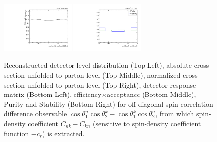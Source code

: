 \begin{figure}[htb]
\begin{center}
 \includegraphics[width=0.32\textwidth]{fig_fullRun2UL/unfolding/combined/TotEff_c_Mnk.pdf}
 \includegraphics[width=0.32\textwidth]{fig_fullRun2UL/unfolding/combined/PurStab_c_Mnk.pdf} \\
\caption{Reconstructed detector-level distribution (Top Left), absolute cross-section unfolded to parton-level (Top Middle), normalized cross-section unfolded to parton-level (Top Right), detector response-matrix (Bottom Left), efficiency$\times$acceptance (Bottom Middle), Purity and Stability (Bottom Right) for off-diagonal spin correlation difference observable $\cos\theta_{1}^{n}\cos\theta_{2}^{k}-\cos\theta_{1}^{k}\cos\theta_{2}^{n}$, from which spin-density coefficient $C_{nk}-C_{kn}$ (sensitive to spin-density coefficient function $-c_r$) is extracted.}
\label{fig:c_Mnk}
\end{center}
\end{figure}
\clearpage
